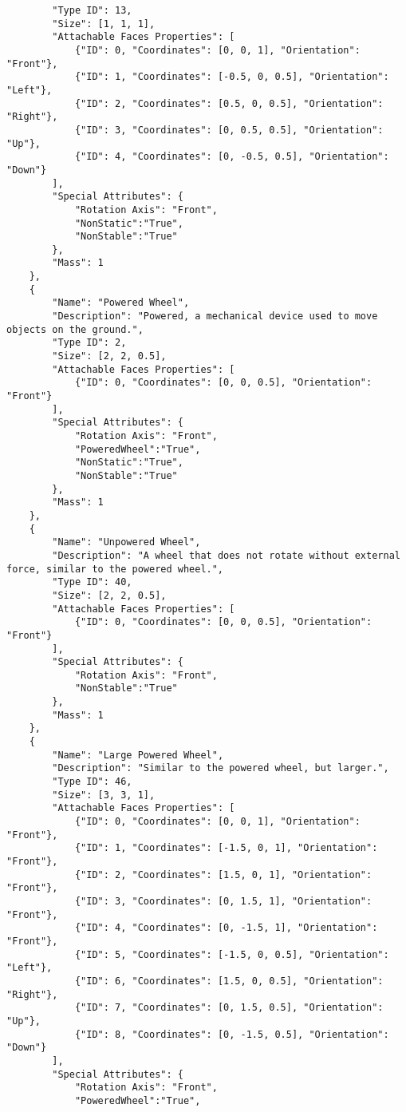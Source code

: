 \begin{lstlisting}
        "Type ID": 13,
        "Size": [1, 1, 1],
        "Attachable Faces Properties": [
            {"ID": 0, "Coordinates": [0, 0, 1], "Orientation": "Front"},
            {"ID": 1, "Coordinates": [-0.5, 0, 0.5], "Orientation": "Left"},
            {"ID": 2, "Coordinates": [0.5, 0, 0.5], "Orientation": "Right"},
            {"ID": 3, "Coordinates": [0, 0.5, 0.5], "Orientation": "Up"},
            {"ID": 4, "Coordinates": [0, -0.5, 0.5], "Orientation": "Down"}
        ],
        "Special Attributes": {
            "Rotation Axis": "Front",
            "NonStatic":"True",
            "NonStable":"True"
        },
        "Mass": 1
    },
    {
        "Name": "Powered Wheel",
        "Description": "Powered, a mechanical device used to move objects on the ground.",
        "Type ID": 2,
        "Size": [2, 2, 0.5],
        "Attachable Faces Properties": [
            {"ID": 0, "Coordinates": [0, 0, 0.5], "Orientation": "Front"}
        ],
        "Special Attributes": {
            "Rotation Axis": "Front",
            "PoweredWheel":"True",
            "NonStatic":"True",
            "NonStable":"True"
        },
        "Mass": 1
    },
    {
        "Name": "Unpowered Wheel",
        "Description": "A wheel that does not rotate without external force, similar to the powered wheel.",
        "Type ID": 40,
        "Size": [2, 2, 0.5],
        "Attachable Faces Properties": [
            {"ID": 0, "Coordinates": [0, 0, 0.5], "Orientation": "Front"}
        ],
        "Special Attributes": {
            "Rotation Axis": "Front",
            "NonStable":"True"
        },
        "Mass": 1
    },
    {
        "Name": "Large Powered Wheel",
        "Description": "Similar to the powered wheel, but larger.",
        "Type ID": 46,
        "Size": [3, 3, 1],
        "Attachable Faces Properties": [
            {"ID": 0, "Coordinates": [0, 0, 1], "Orientation": "Front"},
            {"ID": 1, "Coordinates": [-1.5, 0, 1], "Orientation": "Front"},
            {"ID": 2, "Coordinates": [1.5, 0, 1], "Orientation": "Front"},
            {"ID": 3, "Coordinates": [0, 1.5, 1], "Orientation": "Front"},
            {"ID": 4, "Coordinates": [0, -1.5, 1], "Orientation": "Front"},
            {"ID": 5, "Coordinates": [-1.5, 0, 0.5], "Orientation": "Left"},
            {"ID": 6, "Coordinates": [1.5, 0, 0.5], "Orientation": "Right"},
            {"ID": 7, "Coordinates": [0, 1.5, 0.5], "Orientation": "Up"},
            {"ID": 8, "Coordinates": [0, -1.5, 0.5], "Orientation": "Down"}
        ],
        "Special Attributes": {
            "Rotation Axis": "Front",
            "PoweredWheel":"True",

\end{lstlisting}
